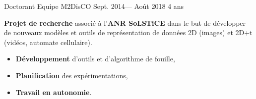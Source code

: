 \jobposition%
{Doctorant}%
{Equipe M2DisCO}
{Sept. 2014--- Août 2018}%
{4 ans}%
{
	\textbf{Projet de recherche} associé à l'\textbf{ANR SoLSTiCE} dans le but de
	développer de nouveaux modèles et outils de représentation de données 2D
	(images) et 2D+t (vidéos, automate cellulaire).
  \vspace{0.5em}
	\begin{itemize}
		\item \textbf{Développement} d’outils et d’algorithme de fouille,
		\item \textbf{Planification} des expérimentations,
		\item \textbf{Travail en autonomie}.
	\end{itemize}
  \vspace{0.5em}
}
